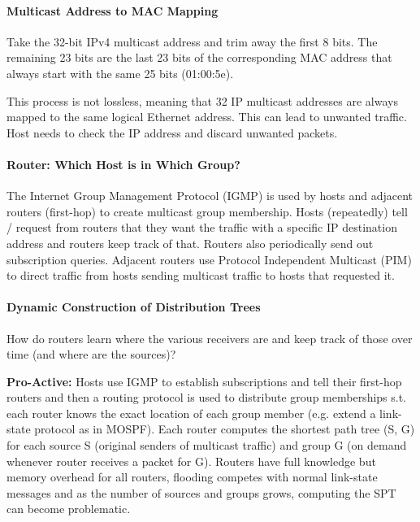 \paragraph{Multicast Address to MAC Mapping}
Take the 32-bit IPv4 multicast address and trim away the first 8 bits. The remaining 23 bits are the last 23 bits of the corresponding MAC address that always start with the same 25 bits (01:00:5e).

This process is not lossless, meaning that 32 IP multicast addresses are always mapped to the same logical Ethernet address. This can lead to unwanted traffic. Host needs to check the IP address and discard unwanted packets.

\paragraph{Router: Which Host is in Which Group?}
The Internet Group Management Protocol (IGMP) is used by hosts and adjacent routers (first-hop) to create multicast group membership. Hosts (repeatedly) tell / request from routers that they want the traffic with a specific IP destination address and routers keep track of that. Routers also periodically send out subscription queries. Adjacent routers use Protocol Independent Multicast (PIM) to direct traffic from hosts sending multicast traffic to hosts that requested it.

\paragraph{Dynamic Construction of Distribution Trees}
How do routers learn where the various receivers are and keep track of those over time (and where are the sources)?

\textbf{Pro-Active:} Hosts use IGMP to establish subscriptions and tell their first-hop routers and then a routing protocol is used to distribute group memberships s.t. each router knows the exact location of each group member (e.g. extend a link-state protocol as in MOSPF). Each router computes the shortest path tree (S, G) for each source S (original senders of multicast traffic) and group G (on demand whenever router receives a packet for G). Routers have full knowledge but memory overhead for all routers, flooding competes with normal link-state messages and as the number of sources and groups grows, computing the SPT can become problematic.

